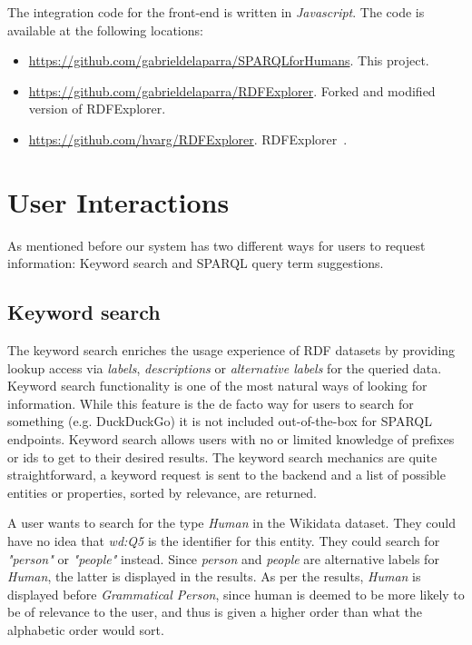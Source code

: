The integration code for the front-end is written in \textit{Javascript}. The code is available at the following locations:
\begin{itemize}
    \item \url{https://github.com/gabrieldelaparra/SPARQLforHumans}. This project.
    \item \url{https://github.com/gabrieldelaparra/RDFExplorer}. Forked and modified version of RDFExplorer.
    \item \url{https://github.com/hvarg/RDFExplorer}. RDFExplorer~\cite{Vargas2019}.
\end{itemize}

\section{User Interactions}

As mentioned before our system has two different ways for users to request information: 
Keyword search 
and SPARQL query term suggestions.

\subsection{Keyword search}

The keyword search enriches the usage experience of RDF datasets by providing lookup access via \textit{labels}, \textit{descriptions} or \textit{alternative labels} for the queried data. 
Keyword search functionality is one of the most natural ways of looking for information. 
While this feature is the de facto way for users to search for something (e.g. DuckDuckGo) it is not included out-of-the-box for SPARQL endpoints. 
Keyword search allows users with no or limited knowledge of prefixes or ids to get to their desired results. 
The keyword search mechanics are quite straightforward, a keyword request is sent to the backend and a list of possible entities or properties, sorted by relevance, are returned. 

\begin{example}
A user wants to search for the type \textit{Human} in the Wikidata dataset. 
They could have no idea that \textit{wd:Q5} is the identifier for this entity. 
They could search for \textit{"person"} or \textit{"people"} instead. 
Since \textit{person} and \textit{people} are alternative labels for \textit{Human}, the latter is displayed in the results. 
As per the results, \textit{Human} is displayed before \textit{Grammatical Person}, since human is deemed to be more likely to be of relevance to the user, and thus is given a higher order than what the alphabetic order would sort.
\end{example}

